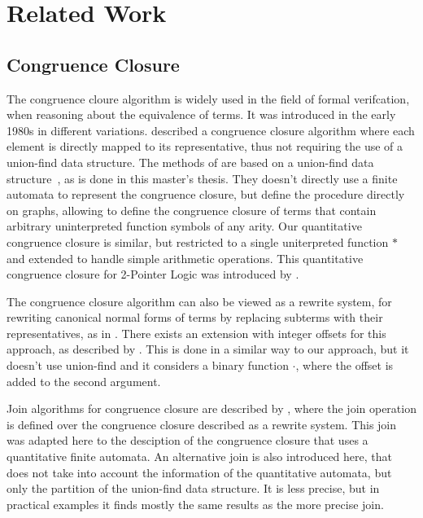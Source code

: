 \chapter{Related Work}\label{chapter:related-work}


\section{Congruence Closure}

The congruence cloure algorithm is widely used in the field of formal verifcation,
when reasoning about the equivalence of terms. It was introduced in the early 1980s
in different variations. \textcite{cc-tarjan} described a congruence closure algorithm
where each element is directly mapped to its representative, thus not requiring the
use of a union-find data structure.
The methods of \textcite{cc-nelson,cc-shostak} are based on a union-find data structure~\cite{uf-tarjan}, as
is done in this master's thesis. They doesn't directly use a finite automata to represent
the congruence closure, but define the procedure directly on graphs,
allowing to define the congruence closure of terms that contain arbitrary uninterpreted function symbols
of any arity.
Our quantitative congruence closure is similar, but restricted to a single uniterpreted function $*$
and extended to handle simple arithmetic operations.
This quantitative congruence closure for 2-Pointer Logic was introduced by \textcite{2pointer}.

The congruence closure algorithm can also be viewed as a rewrite system,
for rewriting canonical normal forms of terms by replacing subterms with their representatives,
as in \cite{cc-kapur,abstract-cc}.
There exists an extension with integer offsets for this approach, as described by \textcite{cc-offsets}.
This is done in a similar way to our approach, but it doesn't use union-find and it considers a
binary function $\cdot$, where the offset is added to the second argument.

Join algorithms for congruence closure are described by \textcite{join},
where the join operation is defined over the congruence closure described
as a rewrite system.
This join was adapted here to the desciption of the congruence closure that uses a quantitative finite automata.
An alternative join is also introduced here, that does not take into account the information of the
quantitative automata, but only the partition of the union-find data structure.
It is less precise, but in practical examples it finds mostly the same results as the more precise join.


